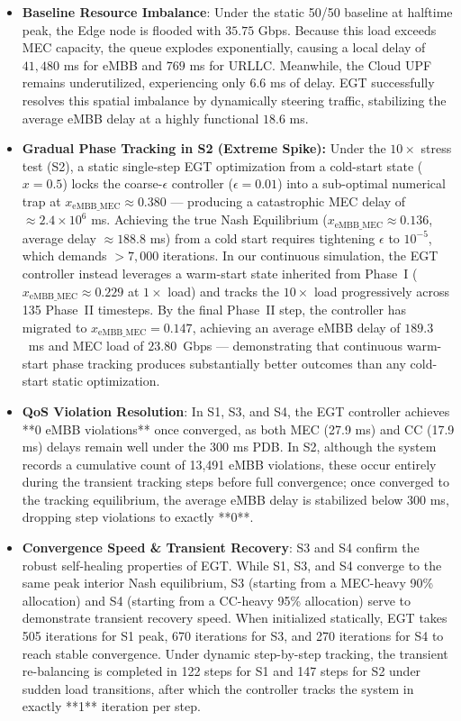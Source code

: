 \documentclass[conference]{IEEEtran}
\begin{document}
\begin{itemize}
    \item \textbf{Baseline Resource Imbalance}: Under the static 50/50 baseline at halftime peak, the Edge node is flooded with $35.75$ Gbps. Because this load exceeds MEC capacity, the queue explodes exponentially, causing a local delay of $41,480$ ms for eMBB and $769$ ms for URLLC. Meanwhile, the Cloud UPF remains underutilized, experiencing only $6.6$ ms of delay. EGT successfully resolves this spatial imbalance by dynamically steering traffic, stabilizing the average eMBB delay at a highly functional $18.6$ ms.
    
    \item \textbf{Gradual Phase Tracking in S2 (Extreme Spike):} Under the $10\times$ stress test (S2), a static single-step EGT optimization from a cold-start state ($x=0.5$) locks the coarse-$\epsilon$ controller ($\epsilon=0.01$) into a sub-optimal numerical trap at $x_{\text{eMBB\_MEC}} \approx 0.380$ --- producing a catastrophic MEC delay of $\approx 2.4 \times 10^6$ ms. Achieving the true Nash Equilibrium ($x_{\text{eMBB\_MEC}} \approx 0.136$, average delay $\approx 188.8$ ms) from a cold start requires tightening $\epsilon$ to $10^{-5}$, which demands $>7{,}000$ iterations. In our continuous simulation, the EGT controller instead leverages a warm-start state inherited from Phase~I ($x_{\text{eMBB\_MEC}} \approx 0.229$ at $1\times$ load) and tracks the $10\times$ load progressively across 135 Phase~II timesteps. By the final Phase~II step, the controller has migrated to $x_{\text{eMBB\_MEC}} = 0.147$, achieving an average eMBB delay of $189.3$~ms and MEC load of $23.80$~Gbps --- demonstrating that continuous warm-start phase tracking produces substantially better outcomes than any cold-start static optimization.
    
    \item \textbf{QoS Violation Resolution}: In S1, S3, and S4, the EGT controller achieves **0 eMBB violations** once converged, as both MEC (27.9 ms) and CC (17.9 ms) delays remain well under the 300 ms PDB. In S2, although the system records a cumulative count of 13,491 eMBB violations, these occur entirely during the transient tracking steps before full convergence; once converged to the tracking equilibrium, the average eMBB delay is stabilized below 300 ms, dropping step violations to exactly **0**.
    
    \item \textbf{Convergence Speed \& Transient Recovery}: S3 and S4 confirm the robust self-healing properties of EGT. While S1, S3, and S4 converge to the same peak interior Nash equilibrium, S3 (starting from a MEC-heavy 90\% allocation) and S4 (starting from a CC-heavy 95\% allocation) serve to demonstrate transient recovery speed. When initialized statically, EGT takes 505 iterations for S1 peak, 670 iterations for S3, and 270 iterations for S4 to reach stable convergence. Under dynamic step-by-step tracking, the transient re-balancing is completed in 122 steps for S1 and 147 steps for S2 under sudden load transitions, after which the controller tracks the system in exactly **1** iteration per step.
\end{itemize}
\end{document}

